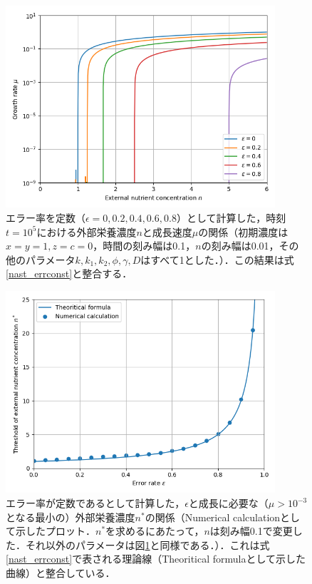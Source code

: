\begin{figure}[htbp]
  \centering
  \includegraphics[width=10cm]{n_vs_mu_errconst.png}
  \caption{エラー率を定数（$\epsilon=0,0.2,0.4,0.6,0.8$）として計算した，時刻$t=10^5$における外部栄養濃度$n$と成長速度$\mu$の関係（初期濃度は$x=y=1, z=c=0$，時間の刻み幅は0.1，$n$の刻み幅は0.01，その他のパラメータ$k,k_1,k_2,\phi,\gamma,D$はすべて1とした．）．この結果は式\eqref{nast_errconst}と整合する．}
  \label{fig:n_vs_mu_errconst}
\end{figure}

\begin{figure}[htbp]
  \centering
  \includegraphics[width=10cm]{err_vs_n_errconst.png}
  \caption{エラー率が定数であるとして計算した，$\epsilon$と成長に必要な（$\mu > 10^{-3}$となる最小の）外部栄養濃度$n^*$の関係（Numerical calculationとして示したプロット．$n^*$を求めるにあたって，$n$は刻み幅0.1で変更した．それ以外のパラメータは図\ref{fig:n_vs_mu_errconst}と同様である．）．これは式\eqref{nast_errconst}で表される理論線（Theoritical formulaとして示した曲線）と整合している．}
  \label{fig:err_vs_n_errconst}
\end{figure}